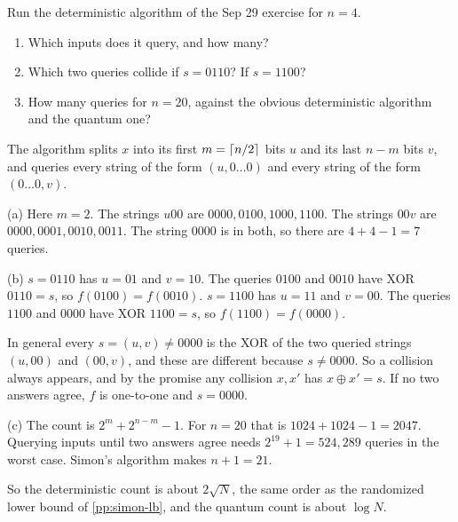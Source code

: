 \begin{exercisebox}
\begin{pproblem}[Deterministic Simon for $n = 4$]\label{pp:det-simon}
    Run the deterministic algorithm of the Sep 29 exercise for $n = 4$.
    \begin{enumerate}[label=(\alph*)]
        \item Which inputs does it query, and how many?
        \item Which two queries collide if $s = 0110$? If $s = 1100$?
        \item How many queries for $n = 20$, against the obvious deterministic algorithm and the
              quantum one?
    \end{enumerate}
\end{pproblem}
\tcblower
\begin{wsolution}
    The algorithm splits $x$ into its first $m = \left\lceil n/2\right\rceil$ bits $u$ and its last $n - m$
    bits $v$, and queries every string of the form $(u, 0 \dots 0)$ and every string of the form
    $(0 \dots 0, v)$.

    (a) Here $m = 2$. The strings $u00$ are $0000, 0100, 1000, 1100$. The strings $00v$ are
    $0000, 0001, 0010, 0011$. The string $0000$ is in both, so there are $4 + 4 - 1 = 7$ queries.

    (b) $s = 0110$ has $u = 01$ and $v = 10$. The queries $0100$ and $0010$ have XOR $0110 = s$, so
    $f(0100) = f(0010)$. $s = 1100$ has $u = 11$ and $v = 00$. The queries $1100$ and $0000$ have
    XOR $1100 = s$, so $f(1100) = f(0000)$.

    In general every $s = (u, v) \neq 0000$ is the XOR of the two queried strings $(u, 00)$ and
    $(00, v)$, and these are different because $s \neq 0000$. So a collision always appears, and by
    the promise any collision $x, x'$ has $x \oplus x' = s$. If no two answers agree, $f$ is
    one-to-one and $s = 0000$.

    (c) The count is $2^m + 2^{n-m} - 1$. For $n = 20$ that is $1024 + 1024 - 1 = 2047$. Querying
    inputs until two answers agree needs $2^{19} + 1 = 524{,}289$ queries in the worst case. Simon's
    algorithm makes $n + 1 = 21$.

    So the deterministic count is about $2\sqrt{N}$, the same order as the randomized lower bound of \cref{pp:simon-lb}, and the quantum count is about $\log N$.
\end{wsolution}
\end{exercisebox}


